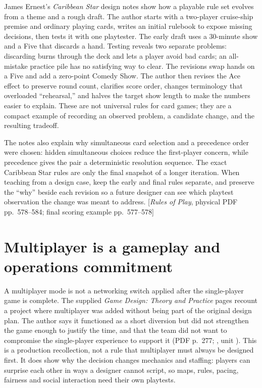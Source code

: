 James Ernest's \emph{Caribbean Star} design notes show how a playable rule set evolves from a theme and a rough draft. The author starts with a two-player cruise-ship premise and ordinary playing cards, writes an initial rulebook to expose missing decisions, then tests it with one playtester. The early draft uses a 30-minute show and a Five that discards a hand. Testing reveals two separate problems: discarding burns through the deck and lets a player avoid bad cards; an all-mistake practice pile has no satisfying way to clear. The revisions swap hands on a Five and add a zero-point Comedy Show. The author then revises the Ace effect to preserve round count, clarifies score order, changes terminology that overloaded ``rehearsal,'' and halves the target show length to make the numbers easier to explain. These are not universal rules for card games; they are a compact example of recording an observed problem, a candidate change, and the resulting tradeoff.

The notes also explain why simultaneous card selection and a precedence order were chosen: hidden simultaneous choices reduce the first-player concern, while precedence gives the pair a deterministic resolution sequence. The exact Caribbean Star rules are only the final snapshot of a longer iteration. When teaching from a design case, keep the early and final rules separate, and preserve the ``why'' beside each revision so a future designer can see which playtest observation the change was meant to address. {[}\emph{Rules of Play}, physical PDF pp.~578--584; final scoring example pp.~577--578{]}

\section{Multiplayer is a gameplay and operations commitment}\label{06-engine-ii-ch047-multiplayer-is-a-gameplay-and-operations-commitment}

\hypertarget{06-engine-ii-ch047-multiplayer-is-a-gameplay-and-operations-commitment}{}

A multiplayer mode is not a networking switch applied after the single-player game is complete. The supplied \emph{Game Design: Theory and Practice} pages recount a project where multiplayer was added without being part of the original design plan. The author says it functioned as a short diversion but did not strengthen the game enough to justify the time, and that the team did not want to compromise the single-player experience to support it (PDF p.~277; , unit ). This is a production recollection, not a rule that multiplayer must always be designed first. It does show why the decision changes mechanics and staffing: players can surprise each other in ways a designer cannot script, so maps, rules, pacing, fairness and social interaction need their own playtests.

